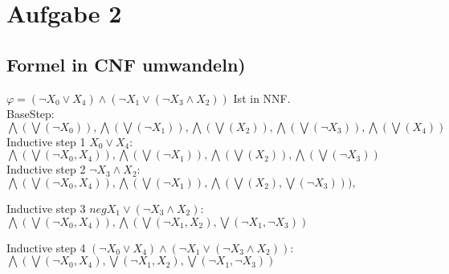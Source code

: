 
\section*{Aufgabe 2}

\subsection*{Formel in CNF umwandeln)}

$\varphi = ( \neg X_0 \vee X_4 ) \wedge (\neg X_1 \vee (\neg X_3 \wedge X_2))$ Ist in NNF.\\

BaseStep:\\

$ \bigwedge ( \bigvee ( \neg X_0 ) ) , \bigwedge ( \bigvee (\neg X_1 ) ) , \bigwedge ( \bigvee (X_2 ) ) , \bigwedge ( \bigvee (\neg X_3 ) ) , \bigwedge ( \bigvee (X_4 ) )  $\\

Inductive step 1 $X_0 \vee X_4$:\\

$  \bigwedge ( \bigvee ( \neg X_0 , X_4 ) )  , \bigwedge ( \bigvee (\neg X_1 ) ) , \bigwedge ( \bigvee (X_2 ) ) , \bigwedge ( \bigvee (\neg X_3 ) )  $\\

Inductive step 2 $\neg X_3 \wedge X_2$:\\

$ \bigwedge ( \bigvee ( \neg X_0 , X_4 ) ) 
, \bigwedge ( \bigvee (\neg X_1 ) ) ,
 \bigwedge ( \bigvee (X_2 ),  \bigvee ( \neg X_3 )) ) ,
 $

Inductive step 3 $neg X_1 \vee ( \neg X_3 \wedge X_2 )$:\\

$ \bigwedge ( \bigvee ( \neg X_0 , X_4 ) ) 
, \bigwedge ( \bigvee (\neg X_1, X_2  ) , \bigvee (\neg X_1, \neg X_3  ) ) 
 $

Inductive step 4 $ ( \neg X_0 \vee X_4 ) \wedge (\neg X_1 \vee (\neg X_3 \wedge X_2))$:\\

$ \bigwedge ( \bigvee ( \neg X_0 , X_4 ) , \bigvee (\neg X_1, X_2  ) , \bigvee (\neg X_1, \neg X_3  ) ) 
 $

